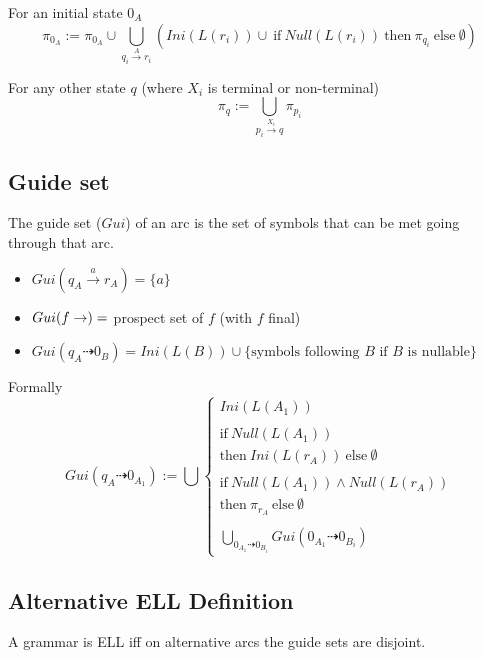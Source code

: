 For an initial state $0_A$
\begin{equation*}
    \pi_{0_A} := \pi_{0_A} \cup \bigcup_{q_i \xrightarrow{A} r_i} (Ini(L(r_i)) \cup \ \text{if}\ Null(L(r_i)) \ \text{then}\ \pi_{q_i} \ \text{else}\ \emptyset)
\end{equation*}

For any other state $q$ (where $X_i$ is terminal or non-terminal)
\begin{equation*}
    \pi_q := \bigcup_{p_i \xrightarrow{X_i} q} \pi_{p_i}
\end{equation*}

\subsection{Guide set}
The guide set ($Gui$) of an arc is the set of symbols that can be met going through that arc.
\begin{itemize}
    \item $Gui(q_A\xrightarrow{a}r_A) = \{a\}$
    \item $Gui(f\rightarrow) =$ prospect set of $f$ (with $f$ final)
    \item $Gui(q_A\dashrightarrow 0_B) = Ini(L(B)) \cup \{\text{symbols following $B$ if $B$ is nullable}\}$
\end{itemize}

Formally
\begin{equation*}
    Gui(q_A \dashrightarrow 0_{A_1}) := \bigcup
    \begin{cases}
        Ini(L(A_1))\\ \\
        \text{if}\ Null(L(A_1)) \\
        \text{then}\ Ini(L(r_A)) \ \text{else}\ \emptyset\\ \\
        \text{if}\ Null(L(A_1)) \land Null(L(r_A)) \\
        \text{then}\ \pi_{r_A} \ \text{else}\ \emptyset \\ \\
        \bigcup_{0_{A_1} \dashrightarrow 0_{B_i}} Gui(0_{A_1} \dashrightarrow 0_{B_i})
    \end{cases}
\end{equation*}

\subsection{Alternative ELL Definition}
A grammar is ELL iff on alternative arcs the guide sets are disjoint.

